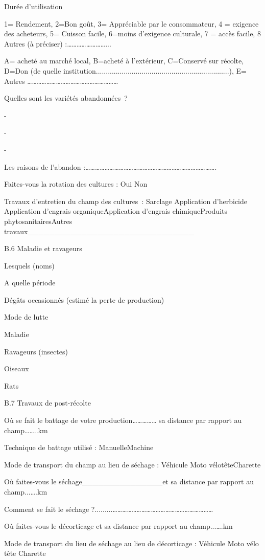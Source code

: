 \documentclass[12pt,oneside]{report}
\begin{document}
Durée d’utilisation

1= Rendement, 2=Bon goût, 3= Appréciable par le consommateur, 4 = exigence des acheteurs, 5= Cuisson facile, 6=moins d’exigence culturale, 7 =  accès facile, 8 Autres (à préciser) :……………………...

A= acheté au marché local, B=acheté à l’extérieur, C=Conservé sur récolte, D=Don (de quelle institution...................................................................), E= Autres …………………………………………………

Quelles sont  les variétés abandonnées ?

-

-

-

Les raisons de l’abandon :……………………………………………………………………….

Faites-vous la rotation des cultures : Oui     Non

Travaux d’entretien du champ des cultures : Sarclage Application d’herbicide Application d’engrais organiqueApplication d’engrais chimiqueProduits phytosanitairesAutres travaux\_\_\_\_\_\_\_\_\_\_\_\_\_\_\_\_\_\_\_\_\_\_\_\_\_\_\_\_\_\_\_

B.6 Maladie et ravageurs

Lesquels (noms)

A quelle période

Dégâts occasionnés (estimé la perte de production)

Mode de lutte

Maladie

Ravageurs (insectes)

Oiseaux

Rats

B.7 Travaux de post-récolte

Où se fait le battage de votre production…………… sa distance par rapport au champ……..km

Technique de battage utilisé : ManuelleMachine

Mode de transport du champ au lieu de séchage : Véhicule Moto  vélotêteCharette

Où faites-vous le séchage\_\_\_\_\_\_\_\_\_\_\_\_\_\_\_et sa distance par rapport au champ...….km

Comment se fait le séchage ?.........………………………………………………………

Où faites-vous le décorticage et sa distance par rapport au champ...….km

Mode de transport du lieu de séchage au lieu de décorticage : Véhicule Moto  vélo   tête Charette
\end{document}
